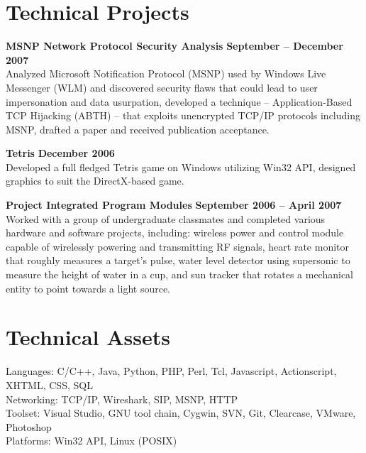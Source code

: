 \documentclass[margin,line]{resume}
\begin{document}
\begin{resume}
    \section{\mysidestyle Technical Projects}
    \textbf{MSNP Network Protocol Security Analysis} \hfill \textbf{September -- December 2007} \vspace{2mm}\\\vspace{1mm}%
    Analyzed Microsoft Notification Protocol (MSNP) used by Windows Live Messenger (WLM) and discovered security flaws that could lead to user impersonation and data usurpation,
    developed a technique -- Application-Based TCP Hijacking (ABTH) -- that exploits unencrypted TCP/IP protocols including MSNP,
    drafted a paper and received publication acceptance.

    \textbf{Tetris} \hfill \textbf{December 2006} \vspace{2mm}\\\vspace{1mm}%
    Developed a full fledged Tetris game on Windows utilizing Win32 API,
    designed graphics to suit the DirectX-based game.

    \textbf{Project Integrated Program Modules} \hfill \textbf{September 2006 -- April 2007} \vspace{2mm}\\\vspace{1mm}%
    Worked with a group of undergraduate classmates and completed various hardware and software projects, including:
    wireless power and control module capable of wirelessly powering and transmitting RF signals,
    heart rate monitor that roughly measures a target's pulse,
    water level detector using supersonic to measure the height of water in a cup, and
    sun tracker that rotates a mechanical entity to point towards a light source.

    \section{\mysidestyle Technical Assets}
    Languages: C/C++, Java, Python, PHP, Perl, Tcl, Javascript, Actionscript, XHTML, CSS, SQL
        \vspace{1mm}\\
    Networking: TCP/IP, Wireshark, SIP, MSNP, HTTP
        \vspace{1mm}\\
    Toolset: Visual Studio, GNU tool chain, Cygwin, SVN, Git, Clearcase, VMware, Photoshop
        \vspace{1mm}\\
    Platforms: Win32 API, Linux (POSIX)


\end{resume}
\end{document}
